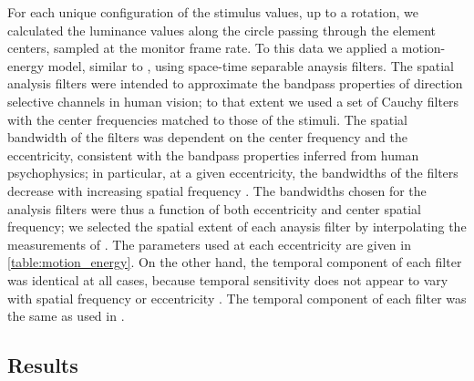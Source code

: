 \documentclass[../manuscript]{subfiles}
\begin{document}
For each unique configuration of the stimulus values, up to a rotation, we calculated the luminance values along the circle passing through the element centers, sampled at the monitor frame rate. To this data we applied a motion-energy model, similar to \cite{Adelson:1985ea}, using space-time separable anaysis filters. The spatial analysis filters were intended to approximate the bandpass properties of direction selective channels in human vision; to that extent we used a set of Cauchy filters \citep{Klein:1985rz} with the center frequencies matched to those of the stimuli. The spatial bandwidth of the filters was dependent on the center frequency and the eccentricity, consistent with the bandpass properties inferred from human psychophysics; in particular, at a given eccentricity, the bandwidths of the filters decrease with increasing spatial frequency  \citep{Anderson:1987oq,Banks:1991kl,Anderson:1991tg}. The bandwidths chosen for the analysis filters were thus a function of both eccentricity and center spatial frequency; we selected the spatial extent of each anaysis filter by interpolating the measurements of \citet{Banks:1991kl}. The parameters used at each eccentricity are given in \autoref{table:motion_energy}. On the other hand, the temporal component of each filter was identical at all cases, because temporal sensitivity does not appear to vary with spatial frequency or eccentricity \citep{Virsu:1982fv,Wright:1983dz}. The temporal component of each filter was the same as used in \cite{Kiani:2008uq}.

\subsection{Results}
\label{sec:grid-results}
\end{document}
